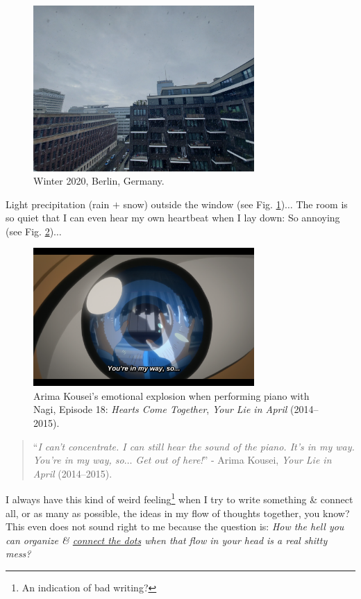 \documentclass[12pt]{article}
\begin{document}
\begin{figure}[H]
	\centering
	\includegraphics[width=0.75\textwidth]{Berlin_winter2020}
	\caption{Winter 2020, Berlin, Germany.}
	\label{fig1}
\end{figure}
Light precipitation (rain $+$ snow) outside the window (see Fig. \ref{fig1})$\ldots$ The room is so quiet that I can even hear my own heartbeat when I lay down: So annoying (see Fig. \ref{fig2})$\ldots$

\begin{figure}[h]
	\centering
	\includegraphics[width=0.75\textwidth]{Arima_Kousei_you_are_in_my_way}
	\caption{Arima Kousei's emotional explosion when performing piano with Nagi, Episode 18: {\it Hearts Come Together}, {\it Your Lie in April} (2014--2015).}
	\label{fig2}
\end{figure}

\begin{quotation}
	``{\it I can't concentrate. I can still hear the sound of the piano. It's in my way. You're in my way, so$\ldots$ Get out of here!}'' - Arima Kousei, {\it Your Lie in April} (2014--2015).
\end{quotation}

I always have this kind of weird feeling\footnote{An indication of bad writing?} when I try to write something \& connect all, or as many as possible, the ideas in my flow of thoughts together, you know? This even does not sound right to me because the question is: {\it How the hell you can organize \& \href{https://en.wikipedia.org/wiki/Connect_the_dots}{connect the dots} when that flow in your head is a real shitty mess?}
\end{document}
